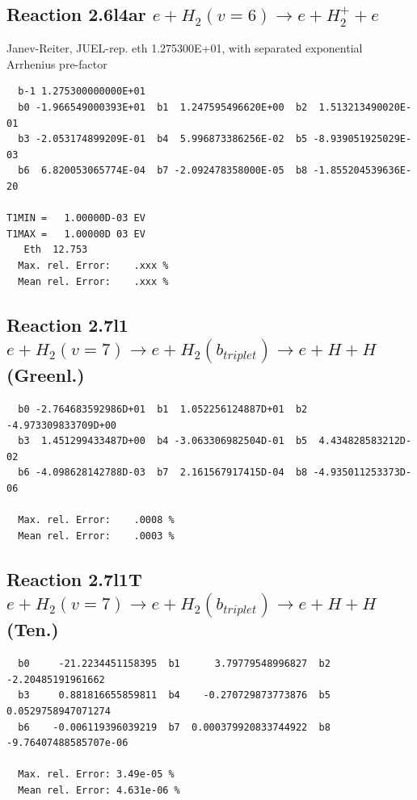 \documentclass[12pt,dvipdfmx]{article}
\begin{document}
\subsection{
Reaction 2.6l4ar
 $ e + H_2(v=6) \rightarrow e + H_2^+  + e$
}
Janev-Reiter, JUEL-rep. eth 1.275300E+01,
with separated exponential Arrhenius pre-factor

\begin{small}\begin{verbatim}
  b-1 1.275300000000E+01
  b0 -1.966549000393E+01  b1  1.247595496620E+00  b2  1.513213490020E-01
  b3 -2.053174899209E-01  b4  5.996873386256E-02  b5 -8.939051925029E-03
  b6  6.820053065774E-04  b7 -2.092478358000E-05  b8 -1.855204539636E-20

T1MIN =   1.00000D-03 EV
T1MAX =   1.00000D 03 EV
   Eth  12.753
  Max. rel. Error:    .xxx %
  Mean rel. Error:    .xxx %
\end{verbatim}\end{small}


\newpage
\subsection{
Reaction 2.7l1
$ e + H_2(v=7) \rightarrow e + H_2(b_{triplet})\rightarrow e + H + H $ (Greenl.)
}


\begin{small}\begin{verbatim}
  b0 -2.764683592986D+01  b1  1.052256124887D+01  b2 -4.973309833709D+00
  b3  1.451299433487D+00  b4 -3.063306982504D-01  b5  4.434828583212D-02
  b6 -4.098628142788D-03  b7  2.161567917415D-04  b8 -4.935011253373D-06

  Max. rel. Error:    .0008 %
  Mean rel. Error:    .0003 %
\end{verbatim}\end{small}


\subsection{
Reaction 2.7l1T
$ e +  H_2(v=7) \rightarrow e +  H_2(b_{triplet})\rightarrow e + H + H $ (Ten.)
}


\begin{small}\begin{verbatim}
  b0     -21.2234451158395  b1      3.79779548996827  b2     -2.20485191961662
  b3     0.881816655859811  b4    -0.270729873773876  b5    0.0529758947071274
  b6    -0.006119396039219  b7  0.000379920833744922  b8 -9.76407488585707e-06

  Max. rel. Error: 3.49e-05 %
  Mean rel. Error: 4.631e-06 %
\end{verbatim}\end{small}
\end{document}
